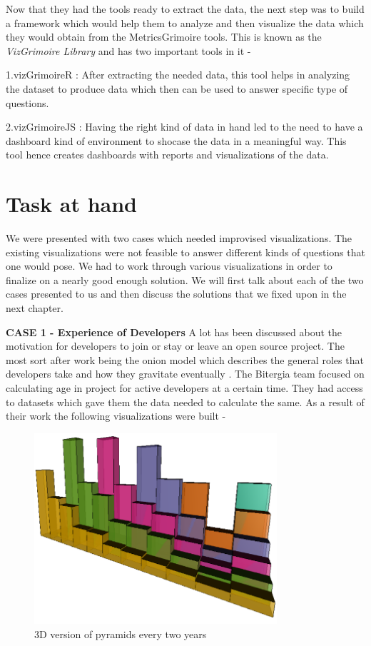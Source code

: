 \documentclass[seploa]{beavtex}
\begin{document}
Now that they had the tools ready to extract the data, the next step was to build a framework which would help them to analyze and then visualize the data which they would obtain from the MetricsGrimoire tools. This is known as the \emph{VizGrimoire Library} and has two important tools in it -

1.vizGrimoireR : After extracting the needed data, this tool helps in analyzing the dataset to produce data which then can be used to answer specific type of questions.

2.vizGrimoireJS : Having the right kind of data in hand led to the need to have a dashboard kind of environment to shocase the data in a meaningful way. This tool hence creates dashboards with reports and visualizations of the data.

\section{Task at hand}
We were presented with two cases which needed improvised visualizations. The existing visualizations were not feasible to answer different kinds of questions that one would pose. We had to work through various visualizations in order to finalize on a nearly good enough solution. We will first talk about each of the two cases presented to us and then discuss the solutions that we fixed upon in the next chapter.

\textbf{CASE 1 - Experience of Developers}
A lot has been discussed about the motivation for developers to join or stay or leave an open source project. The most sort after work being the onion model which describes the general roles that developers take and how they gravitate eventually \cite{crowston2005,  kishida2003}. The Bitergia team focused on calculating age in project for active developers at a certain time. They had access to datasets which gave them the data needed to calculate the same. As a result of their work the following visualizations were built - 

\begin{figure}[!ht]
\centering
\includegraphics[width=90mm]{age2.png}
\caption{3D version of pyramids every two years}
\end{figure}
\end{document}
